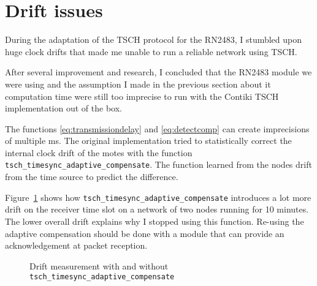 \section{Drift issues}

During the adaptation of the TSCH protocol for the RN2483, I stumbled upon huge
clock drifts that made me unable to run a reliable network using TSCH.

After several improvement and research, I concluded that the RN2483
module we were using and the assumption I made in the previous section about it
computation time were still too imprecise to run with the Contiki TSCH
implementation out of the box.

The functions \ref{eq:transmissiondelay} and \ref{eq:detectcomp} can
create imprecisions of multiple ms.
The original implementation tried to statistically correct the internal clock
drift of the motes with the function
\lstinline{tsch_timesync_adaptive_compensate}.
The function learned from the nodes drift from the time source to predict the
difference.

Figure~\ref{fig:driftmeasurement} shows how
\lstinline{tsch_timesync_adaptive_compensate} introduces a lot more drift on the
receiver time slot on a network of two nodes running for 10 minutes.
The lower overall drift explains why I stopped using this function.
Re-using the adaptive compensation should be done with a module that can
provide an acknowledgement at packet reception.

\begin{figure}[H]
  \centering
  \caption{Drift measurement with and without \lstinline{tsch_timesync_adaptive_compensate}\label{fig:driftmeasurement}}
\end{figure}

